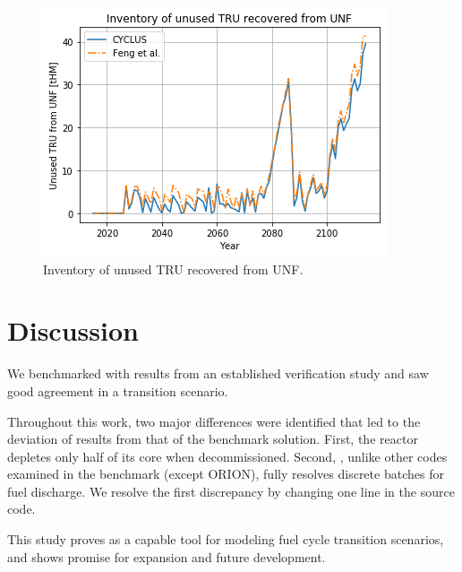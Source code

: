 \begin{figure}[htbp!]
	\begin{center}
		\includegraphics[scale=0.5]{./images/results_18/tru.png}
	\end{center}
	\caption{Inventory of unused \gls{TRU} recovered from \gls{UNF}.}
	\label{fig:tru}
\end{figure}

\section{Discussion}

We benchmarked \Cyclus with results from an established
verification study and saw good agreement
in a transition scenario.

Throughout this work, two major differences were identified
that led to the deviation
of \Cyclus results from that of the benchmark solution. First,
the \Cycamore reactor depletes only half of its core
when decommissioned. Second, \Cyclus, unlike other
codes examined in the benchmark (except ORION), fully resolves
discrete batches for fuel discharge.
We resolve the first discrepancy by changing one line in the source code.

This study proves \Cyclus as a capable tool for modeling
fuel cycle transition scenarios, and shows promise for
expansion and future development.